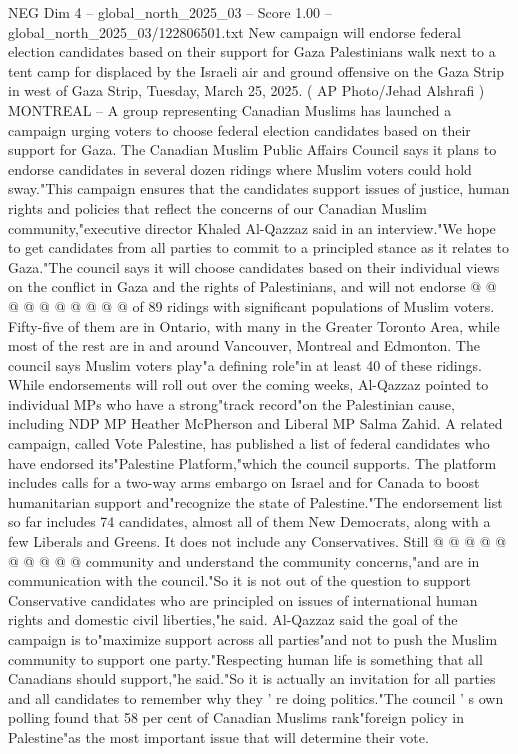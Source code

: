 \begin{textsample}{NEG Dim 4 – global\_north\_2025\_03 – Score 1.00 – global\_north\_2025\_03/122806501.txt}  \label{ex:f4_neg_394}
New campaign will endorse federal election candidates based on their support for Gaza Palestinians walk next to a tent camp for displaced by the Israeli air and ground offensive on the Gaza Strip in west of Gaza Strip, Tuesday, March 25, 2025. ( AP Photo/Jehad Alshrafi ) MONTREAL -- A group representing Canadian Muslims has launched a campaign urging voters to choose federal election candidates based on their support for Gaza.
The Canadian Muslim Public Affairs Council says it plans to endorse candidates in several dozen ridings where Muslim voters could hold sway."This campaign ensures that the candidates support issues of justice, human rights and policies that reflect the concerns of our Canadian Muslim community,"executive director Khaled Al-Qazzaz said in an interview."We hope to get candidates from all parties to commit to a principled stance as it relates to Gaza."The council says it will choose candidates based on their individual views on the conflict in Gaza and the rights of Palestinians, and will not endorse @ @ @ @ @ @ @ @ @ @ of 89 ridings with significant populations of Muslim voters.
Fifty-five of them are in Ontario, with many in the Greater Toronto Area, while most of the rest are in and around Vancouver, Montreal and Edmonton.
The council says Muslim voters play"a defining role"in at least 40 of these ridings.
While endorsements will roll out over the coming weeks, Al-Qazzaz pointed to individual MPs who have a strong"track record"on the Palestinian cause, including NDP MP Heather McPherson and Liberal MP Salma Zahid.
A related campaign, called Vote Palestine, has published a list of federal candidates who have endorsed its"Palestine Platform,"which the council supports.
The platform includes calls for a two-way arms embargo on Israel and for Canada to boost humanitarian support and"recognize the state of Palestine."The endorsement list so far includes 74 candidates, almost all of them New Democrats, along with a few Liberals and Greens.
It does not include any Conservatives.
Still @ @ @ @ @ @ @ @ @ @ community and understand the community concerns,"and are in communication with the council."So it is not out of the question to support Conservative candidates who are principled on issues of international human rights and domestic civil liberties,"he said.
Al-Qazzaz said the goal of the campaign is to"maximize support across all parties"and not to push the Muslim community to support one party."Respecting human life is something that all Canadians should support,"he said."So it is actually an invitation for all parties and all candidates to remember why they ' re doing politics."The council ' s own polling found that 58 per cent of Canadian Muslims rank"foreign policy in Palestine"as the most important issue that will determine their vote.

\end{textsample}
